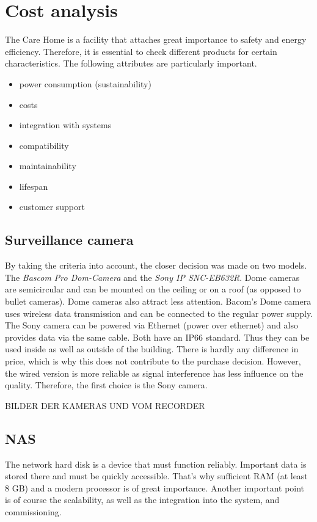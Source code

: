 \chapter{Cost analysis}
The Care Home is a facility that attaches great importance to safety and energy efficiency. Therefore, it is essential to check different products for certain characteristics. The following attributes are particularly important.
\begin{itemize}
	\item power consumption (sustainability)
	\item costs
	\item integration with systems
	\item compatibility
	\item maintainability
	\item lifespan
	\item customer support 
\end{itemize}

\section{Surveillance camera}
By taking the criteria into account, the closer decision was made on two models. The \textit{Bascom Pro Dom-Camera} and the \textit{Sony IP SNC-EB632R}. Dome cameras are semicircular and can be mounted on the ceiling or on a roof (as opposed to bullet cameras). Dome cameras also attract less attention. Bacom's Dome camera uses wireless data transmission and can be connected to the regular power supply. The Sony camera can be powered via Ethernet (power over ethernet) and also provides data via the same cable. Both have an IP66 standard. Thus they can be used inside as well as outside of the building. There is hardly any difference in price, which is why this does not contribute to the purchase decision. However, the wired version is more reliable as signal interference has less influence on the quality. Therefore, the first choice is the Sony camera.

BILDER DER KAMERAS UND VOM RECORDER

\section{NAS }
The network hard disk is a device that must function reliably. Important data is stored there and must be quickly accessible. That's why sufficient RAM (at least 8 GB) and a modern processor is of great importance. Another important point is of course the scalability, as well as the integration into the system, and commissioning.

